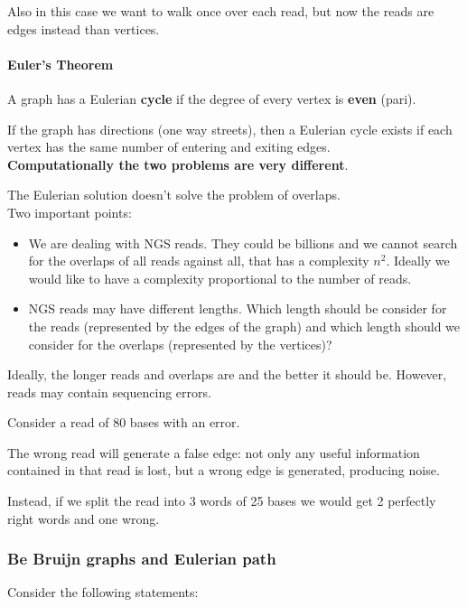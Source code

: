 Also in this case we want to walk once over each read, but 
now the reads are edges instead than vertices.

\paragraph*{Euler's Theorem} A graph has a Eulerian \textbf{cycle} if the
degree of every vertex is \textbf{even} (pari).

If the graph has directions (one way streets), then a Eulerian
cycle exists if each vertex has the same number of entering and exiting edges. \\

\textbf{Computationally the two problems are very different}.

The Eulerian solution doesn't solve the problem of overlaps.\\

Two important points:

\begin{itemize}
	\item We are dealing with NGS reads. They could be billions and we cannot
search for the overlaps of all reads against all, that has a complexity
$n^2$. Ideally we would like to have a complexity proportional to the number
of reads.
	\item NGS reads may have different lengths. Which length should be
consider for the reads (represented by the edges of the graph) and
which length should we consider for the overlaps (represented by the vertices)?
\end{itemize}

Ideally, the longer reads and overlaps are and the better it should be.
However, reads may contain sequencing errors.

Consider a read of 80 bases with an error. 

The wrong read will generate a false edge: not only any useful information
contained in that read is lost, but a wrong edge is generated, producing noise.

Instead, if we split the read into 3 words of 25 bases we would get 2
perfectly right words and one wrong.

\subsubsection{Be Bruijn graphs and Eulerian path}

Consider the following statements:

